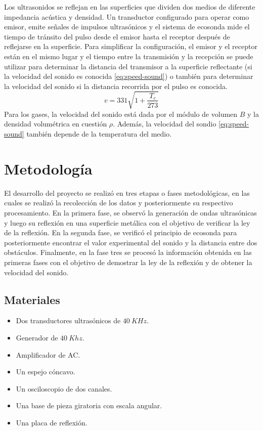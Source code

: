 \documentclass[spanish,notitlepage,letterpaper, 12pt]{article}
\begin{document}
\shorthandon{>}
Los ultrasonidos se reflejan en las superficies que dividen dos medios de diferente
impedancia acústica y densidad. Un transductor configurado para operar como emisor,
emite señales de impulsos ultrasónicos y el sistema de ecosonda mide el tiempo de tránsito
del pulso desde el emisor hasta el receptor después de reflejarse en la superficie. Para
simplificar la configuración, el emisor y el receptor están en el mismo lugar y el tiempo entre
la transmisión y la recepción se puede utilizar para determinar la distancia del transmisor a
la superficie reflectante (si la velocidad del sonido es conocida \eqref{eq:speed-sound}) o también para determinar
la velocidad del sonido si la distancia recorrida por el pulso es conocida.
\begin{equation}\label{eq:speed-sound}
    v=331\sqrt{1+\frac{T_c}{273}}
\end{equation}
Para los gases, la velocidad del sonido está dada por el módulo de volumen $B$ y la densidad volumétrica en cuestión $\rho$. Además, la velocidad del sondio \eqref{eq:speed-sound} también depende de la temperatura del medio. \cite{serway_jewett_2017}
\section{Metodología}
El desarrollo del proyecto se realizó en tres etapas o fases metodológicas, en las cuales
se realizó la recolección de los datos y posteriormente su respectivo procesamiento. En la
primera fase, se observó la generación de ondas ultrasónicas y luego su reflexión en una
superficie metálica con el objetivo de verificar la ley de la reflexión. En la segunda fase, se
verificó el principio de ecosonda para posteriormente encontrar el valor experimental del
sonido y la distancia entre dos obstáculos. Finalmente, en la fase tres se procesó la
información obtenida en las primeras fases con el objetivo de demostrar la ley de la reflexión
y de obtener la velocidad del sonido.
\subsection{Materiales}
\begin{itemize}
    \item Dos transductores ultrasónicos de $40\ KHz$.
    \item Generador de $40\ Khz$.
    \item Amplificador de AC.
    \item Un espejo cóncavo.
    \item Un osciloscopio de dos canales.
    \item Una base de pieza giratoria con escala angular.
    \item Una placa de reflexión.
\end{itemize}
\end{document}

